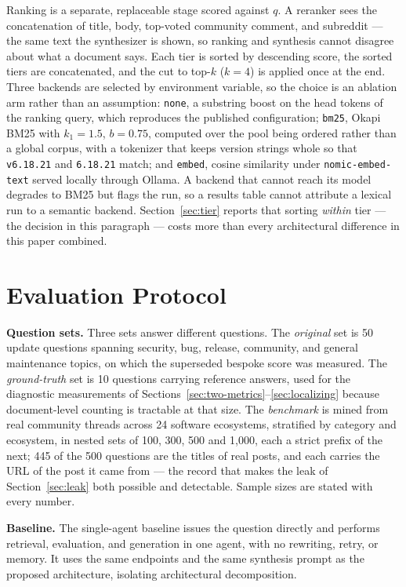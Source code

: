 \documentclass[10pt,conference]{IEEEtran}
\begin{document}
Ranking is a separate, replaceable stage scored against $q$. A reranker sees the
concatenation of title, body, top-voted community comment, and subreddit --- the
same text the synthesizer is shown, so ranking and synthesis cannot disagree
about what a document says. Each tier is sorted by descending score, the sorted
tiers are concatenated, and the cut to top-$k$ ($k=4$) is applied once at the
end. Three backends are selected by environment variable, so the choice is an
ablation arm rather than an assumption: \texttt{none}, a substring boost on the
head tokens of the ranking query, which reproduces the published configuration;
\texttt{bm25}, Okapi BM25 with $k_1=1.5$, $b=0.75$, computed over the pool being
ordered rather than a global corpus, with a tokenizer that keeps version strings
whole so that \texttt{v6.18.21} and \texttt{6.18.21} match; and \texttt{embed},
cosine similarity under \texttt{nomic-embed-text} served locally through Ollama. A
backend that cannot reach its model degrades to BM25 but flags the run, so a
results table cannot attribute a lexical run to a semantic backend.
Section~\ref{sec:tier} reports that sorting \emph{within} tier --- the decision
in this paragraph --- costs more than every architectural difference in this
paper combined.

\section{Evaluation Protocol}\label{sec:setup}

\textbf{Question sets.} Three sets answer different questions. The
\emph{original} set is 50 update questions spanning security, bug, release,
community, and general maintenance topics, on which the superseded bespoke score
was measured. The \emph{ground-truth} set is 10 questions carrying reference
answers, used for the diagnostic measurements of
Sections~\ref{sec:two-metrics}--\ref{sec:localizing} because document-level
counting is tractable at that size. The \emph{benchmark} is mined from real
community threads across 24 software ecosystems, stratified by category and
ecosystem, in nested sets of 100, 300, 500 and 1{,}000, each a strict prefix of
the next; 445 of the 500 questions are the titles of real posts, and each
carries the URL of the post it came from --- the record that makes the leak of
Section~\ref{sec:leak} both possible and detectable. Sample sizes are stated
with every number.

\textbf{Baseline.} The single-agent baseline issues the question directly and
performs retrieval, evaluation, and generation in one agent, with no rewriting,
retry, or memory. It uses the same endpoints and the same synthesis prompt as
the proposed architecture, isolating architectural decomposition.
\end{document}
